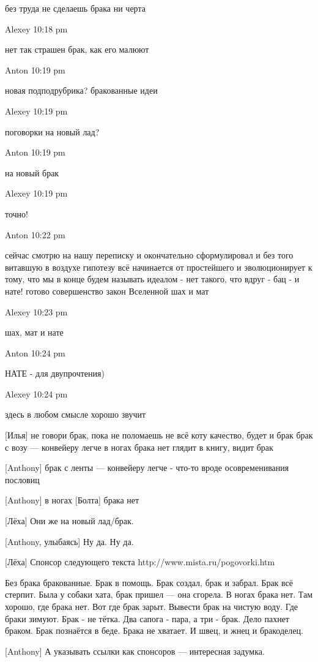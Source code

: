     без труда не сделаешь брака ни черта

Alexey 10:18 pm

    нет так страшен брак, как его малюют

Anton 10:19 pm

    новая подподрубрика?
    бракованные идеи

Alexey 10:19 pm

    поговорки на новый лад?

Anton 10:19 pm

    на новый брак

Alexey 10:19 pm

    точно!

Anton 10:22 pm

    сейчас смотрю на нашу переписку и окончательно сформулировал и без того витавшую в воздухе гипотезу
    всё начинается от простейшего и эволюционирует к тому, что мы в конце будем называть идеалом - нет такого, что вдруг - бац - и нате! готово совершенство
    закон Вселенной
    шах и мат

Alexey 10:23 pm

    шах, мат и нате

Anton 10:24 pm

    НАТЕ - для двупрочтения)

Alexey 10:24 pm

    здесь в любом смысле хорошо звучит


[Илья]
не говори брак, пока не поломаешь
не всё коту качество, будет и брак
брак с возу — конвейеру легче
в ногах брака нет
глядит в книгу, видит брак


[Anthony]
брак с ленты — конвейеру легче - что-то вроде осовременивания пословиц


[Anthony]
в ногах [Болта] брака нет


[Лёха]
Они же на новый лад/брак.


[Anthony, улыбаясь]
Ну да. Ну да.


[Лёха]
Спонсор следующего текста http://www.mista.ru/pogovorki.htm

Без брака бракованные.
Брак в помощь.
Брак создал, брак и забрал.
Брак всё стерпит.
Была у собаки хата, брак пришел — она сгорела.
В ногах брака нет.
Там хорошо, где брака нет.
Вот где брак зарыт.
Вывести брак на чистую воду.
Где браки зимуют.
Брак - не тётка.
Два сапога - пара, а три - брак.
Дело пахнет браком.
Брак познаётся в беде.
Брака не хватает.
И швец, и жнец и бракоделец.


[Anthony]
А указывать ссылки как спонсоров --- интересная задумка.



